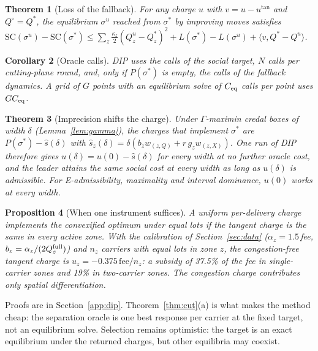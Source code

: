 \documentclass[preprint,11pt]{elsarticle}
\newtheorem{theorem}{Theorem}
\newtheorem{proposition}[theorem]{Proposition}
\newtheorem{corollary}[theorem]{Corollary}
\theoremstyle{definition}
\theoremstyle{remark}
\newcommand{\ip}[2]{\langle #1,#2\rangle}
\begin{document}
\begin{theorem}[Loss of the fallback]\label{thm:fallback}
For any charge $u$ with $v=u-u^{\tan}$ and $Q^\circ=Q^*$, the equilibrium $\sigma^u$ reached from $\sigma^*$ by improving moves satisfies $\mathrm{SC}(\sigma^u)-\mathrm{SC}(\sigma^*)\le\sum_z\tfrac{\kappa_z}{2}(Q^u_z-Q^*_z)^2+L(\sigma^*)-L(\sigma^u)+\ip{v}{Q^*-Q^u}$.
\end{theorem}

\begin{corollary}[Oracle calls]\label{cor:calls}
DIP uses the calls of the social target, $N$ calls per cutting-plane round, and, only if $P(\sigma^*)$ is empty, the calls of the fallback dynamics. A grid of $G$ points with an equilibrium solve of $C_{\rm eq}$ calls per point uses $GC_{\rm eq}$.
\end{corollary}

\begin{theorem}[Imprecision shifts the charge]\label{thm:credal}
Under $\Gamma$-maximin credal boxes of width $\delta$ (Lemma~\ref{lem:gamma}), the charges that implement $\sigma^*$ are $P(\sigma^*)-\hat s(\delta)$ with $\hat s_z(\delta)=\delta(b_zw_{(z,Q)}+r\,g_zw_{(z,X)})$. One run of DIP therefore gives $u(\delta)=u(0)-\hat s(\delta)$ for every width at no further oracle cost, and the leader attains the same social cost at every width as long as $u(\delta)$ is admissible. For E-admissibility, maximality and interval dominance, $u(0)$ works at every width.
\end{theorem}

\begin{proposition}[When one instrument suffices]\label{prop:uniform}
A uniform per-delivery charge implements the convexified optimum under equal lots if the tangent charge is the same in every active zone. With the calibration of Section~\ref{sec:data} ($\alpha_z=1.5\,$fee, $b_z=\alpha_z/(2Q^{\rm full}_z)$) and $n_z$ carriers with equal lots in zone $z$, the congestion-free tangent charge is $u_z=-0.375\,\mathrm{fee}/n_z$: a subsidy of 37.5\% of the fee in single-carrier zones and 19\% in two-carrier zones. The congestion charge contributes only spatial differentiation.
\end{proposition}

Proofs are in Section~\ref{app:dip}. Theorem~\ref{thm:cut}(a) is what makes the method cheap: the separation oracle is one best response per carrier at the fixed target, not an equilibrium solve. Selection remains optimistic: the target is an exact equilibrium under the returned charges, but other equilibria may coexist.
\end{document}

